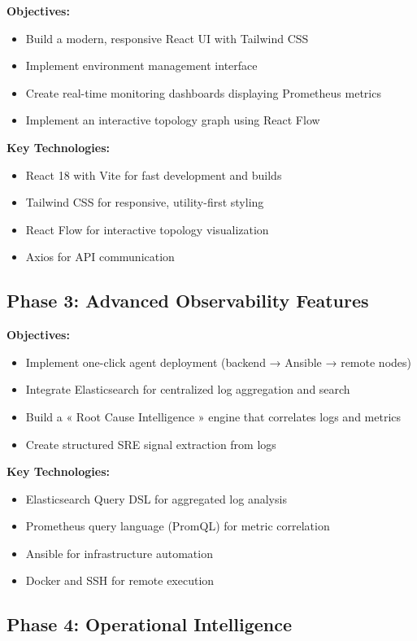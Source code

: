 \documentclass[12pt,a4paper]{report}
\begin{document}
\textbf{Objectives:}
\begin{itemize}
  \item Build a modern, responsive React UI with Tailwind CSS
  \item Implement environment management interface
  \item Create real-time monitoring dashboards displaying Prometheus metrics
  \item Implement an interactive topology graph using React Flow
\end{itemize}

\textbf{Key Technologies:}
\begin{itemize}
  \item React 18 with Vite for fast development and builds
  \item Tailwind CSS for responsive, utility-first styling
  \item React Flow for interactive topology visualization
  \item Axios for API communication
\end{itemize}

\subsection{Phase 3: Advanced Observability Features}

\textbf{Objectives:}
\begin{itemize}
  \item Implement one-click agent deployment (backend → Ansible → remote nodes)
  \item Integrate Elasticsearch for centralized log aggregation and search
  \item Build a « Root Cause Intelligence » engine that correlates logs and metrics
  \item Create structured SRE signal extraction from logs
\end{itemize}

\textbf{Key Technologies:}
\begin{itemize}
  \item Elasticsearch Query DSL for aggregated log analysis
  \item Prometheus query language (PromQL) for metric correlation
  \item Ansible for infrastructure automation
  \item Docker and SSH for remote execution
\end{itemize}

\subsection{Phase 4: Operational Intelligence}
\end{document}
